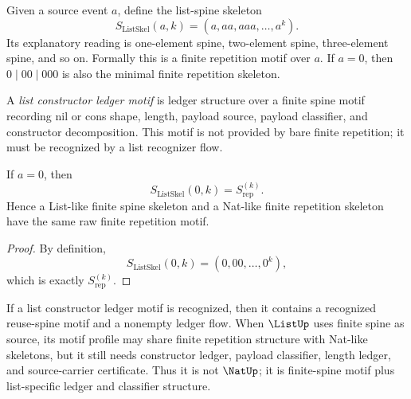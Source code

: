 \begin{definition}
\label{def:case-studies-list-spine}
Given a source event $a$, define the list-spine skeleton
$$
  S_{\mathrm{ListSkel}}(a,k)
  =
  (a,aa,aaa,\ldots,a^k).
$$
Its explanatory reading is one-element spine, two-element spine, three-element spine, and so on. Formally this is a finite repetition motif over $a$. If $a=0$, then $0\mid 00\mid 000$ is also the minimal finite repetition skeleton.
\end{definition}

\begin{definition}
\label{def:case-studies-list-constructor-ledger}
A \emph{list constructor ledger motif} is ledger structure over a finite spine motif recording nil or cons shape, length, payload source, payload classifier, and constructor decomposition. This motif is not provided by bare finite repetition; it must be recognized by a list recognizer flow.
\end{definition}

\begin{proposition}
\label{prop:case-studies-list-shares-repetition-with-nat}
If $a=0$, then
$$
  S_{\mathrm{ListSkel}}(0,k)=S_{\mathrm{rep}}^{(k)}.
$$
Hence a List-like finite spine skeleton and a Nat-like finite repetition skeleton have the same raw finite repetition motif.
\end{proposition}

\begin{proof}
By definition,
$$
  S_{\mathrm{ListSkel}}(0,k)=(0,00,\ldots,0^k),
$$
which is exactly $S_{\mathrm{rep}}^{(k)}$.
\end{proof}

\begin{corollary}
\label{cor:case-studies-list-finite-plus-ledger}
If a list constructor ledger motif is recognized, then it contains a recognized reuse-spine motif and a nonempty ledger flow. When $\ListUp$ uses finite spine as source, its motif profile may share finite repetition structure with Nat-like skeletons, but it still needs constructor ledger, payload classifier, length ledger, and source-carrier certificate. Thus it is not $\NatUp$; it is finite-spine motif plus list-specific ledger and classifier structure.
\end{corollary}

